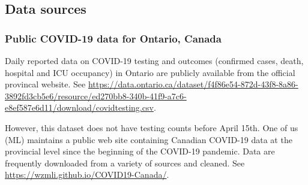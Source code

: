 \documentclass[12pt]{article}\usepackage[]{graphicx}\usepackage[]{color}
\begin{document}
\thickredline

\subsection{Data sources}

% 
% 

\subsubsection*{Public COVID-19 data for Ontario, Canada}


Daily reported data on COVID-19 testing and outcomes (confirmed cases, death, hospital and ICU occupancy) in Ontario are publicly available from the official provincal website. See
\url{https://data.ontario.ca/dataset/f4f86e54-872d-43f8-8a86-3892fd3cb5e6/resource/ed270bb8-340b-41f9-a7c6-e8ef587e6d11/download/covidtesting.csv}.

However, this dataset does not have testing counts before April 15th. 
One of us (ML) maintains a public web site containing Canadian COVID-19 data at the provincial level since the beginning of the COVID-19 pandemic.   
Data are frequently downloaded from a variety of sources and cleaned.  See
\url{https://wzmli.github.io/COVID19-Canada/}.

\end{document}
